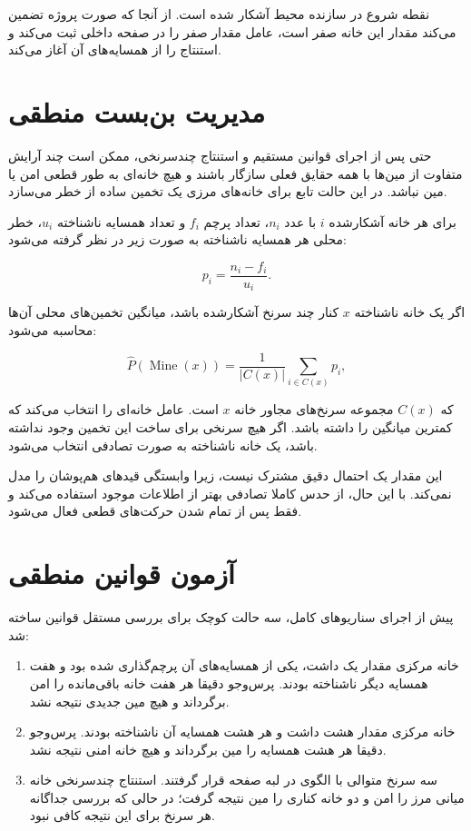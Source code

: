 \documentclass[10.5pt]{exam}
\begin{document}
نقطه شروع در سازنده محیط آشکار شده است. از آنجا که صورت پروژه تضمین می‌کند مقدار این خانه صفر است، عامل مقدار صفر را در صفحه داخلی ثبت می‌کند و استنتاج را از همسایه‌های آن آغاز می‌کند.

\section{مدیریت بن‌بست منطقی}
حتی پس از اجرای قوانین مستقیم و استنتاج چندسرنخی، ممکن است چند آرایش متفاوت از مین‌ها با همه حقایق فعلی سازگار باشند و هیچ خانه‌ای به طور قطعی امن یا مین نباشد. در این حالت تابع
برای خانه‌های مرزی یک تخمین ساده از خطر می‌سازد.

برای هر خانه آشکارشده $i$ با عدد $n_i$، تعداد پرچم $f_i$ و تعداد همسایه ناشناخته $u_i$، خطر محلی هر همسایه ناشناخته به صورت زیر در نظر گرفته می‌شود:

\[
    p_i = \frac{n_i-f_i}{u_i}.
\]

اگر یک خانه ناشناخته $x$ کنار چند سرنخ آشکارشده باشد، میانگین تخمین‌های محلی آن‌ها محاسبه می‌شود:

\[
    \widehat{P}(\operatorname{Mine}(x))
    = \frac{1}{|C(x)|}\sum_{i\in C(x)}p_i,
\]

که $C(x)$ مجموعه سرنخ‌های مجاور خانه $x$ است. عامل خانه‌ای را انتخاب می‌کند که کمترین میانگین را داشته باشد. اگر هیچ سرنخی برای ساخت این تخمین وجود نداشته باشد، یک خانه ناشناخته به صورت تصادفی انتخاب می‌شود.

این مقدار یک احتمال دقیق مشترک نیست، زیرا وابستگی قیدهای هم‌پوشان را مدل نمی‌کند. با این حال، از حدس کاملا تصادفی بهتر از اطلاعات موجود استفاده می‌کند و فقط پس از تمام شدن حرکت‌های قطعی فعال می‌شود.

\section{آزمون قوانین منطقی}
پیش از اجرای سناریوهای کامل، سه حالت کوچک برای بررسی مستقل قوانین ساخته شد:

\begin{enumerate}
    \item خانه مرکزی مقدار یک داشت، یکی از همسایه‌های آن پرچم‌گذاری شده بود و هفت همسایه دیگر ناشناخته بودند. پرس‌وجو دقیقا هر هفت خانه باقی‌مانده را امن برگرداند و هیچ مین جدیدی نتیجه نشد.
    \item خانه مرکزی مقدار هشت داشت و هر هشت همسایه آن ناشناخته بودند. پرس‌وجو دقیقا هر هشت همسایه را مین برگرداند و هیچ خانه امنی نتیجه نشد.
    \item سه سرنخ متوالی با الگوی
          در لبه صفحه قرار گرفتند. استنتاج چندسرنخی خانه میانی مرز را امن و دو خانه کناری را مین نتیجه گرفت؛ در حالی که بررسی جداگانه هر سرنخ برای این نتیجه کافی نبود.
\end{enumerate}
\end{document}
